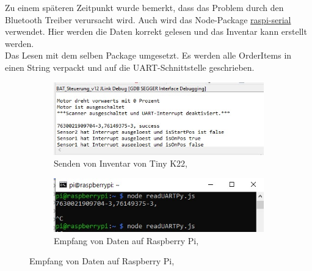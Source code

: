 Zu einem späteren Zeitpunkt wurde bemerkt, dass das Problem durch den Bluetooth Treiber verursacht wird. Auch wird das Node-Package \href{https://www.npmjs.com/package/raspi-serial}{raspi-serial} verwendet. Hier werden die Daten korrekt gelesen und das Inventar kann erstellt werden. \\
Das Lesen mit dem selben Package umgesetzt. Es werden alle OrderItems in einen String verpackt und auf die \ac{UART}-Schnittstelle geschrieben. 

\begin{figure}[H]
	\begin{subfigure}[b]{0.4\textwidth}
		\includegraphics[scale=0.4]{images/sendUartFromTiny.jpeg}
		\caption[Senden von Inventar von Tiny K22]{Senden von Inventar von Tiny K22, \cite{arnoldPhilip:private}}
		\label{img: sendUart}
	\end{subfigure}
	\hfill
	\begin{subfigure}[b]{0.4\textwidth}
		\includegraphics[scale=0.4]{images/uartRead.jpeg}
		\caption[Empfang von Daten auf Raspberry Pi]{Empfang von Daten auf Raspberry Pi, \cite{arnoldPhilip:private}}
		\label{img: readUART}
	\end{subfigure}
\end{figure} 

